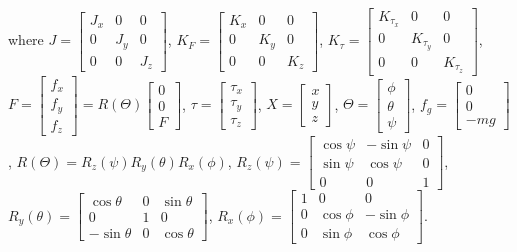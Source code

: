 \documentclass{ieeeaccess}
\begin{document}
where $J=\begin{bmatrix}
    J_{x} & 0 & 0 \\
    0 & J_{y} & 0 \\
    0 & 0 & J_{z}
\end{bmatrix}$, $K_F=\begin{bmatrix}
    K_{x} & 0 & 0 \\
    0 & K_{y} & 0 \\
    0 & 0 & K_{z}
\end{bmatrix}$, $K_\tau=\begin{bmatrix}
    K_{\tau_x} & 0 & 0 \\
    0 & K_{\tau_y} & 0 \\
    0 & 0 & K_{\tau_z}
\end{bmatrix}$, $F =\begin{bmatrix}
    f_x \\ f_y \\ f_z
\end{bmatrix} = R(\Theta)\begin{bmatrix}
    0 \\ 0 \\ F
\end{bmatrix}$, $\tau=\begin{bmatrix}
    \tau_x \\ \tau_y \\ \tau_z
\end{bmatrix}$, $X=\begin{bmatrix}
    x \\ y \\ z
\end{bmatrix}$, $\Theta=\begin{bmatrix}
    \phi \\ \theta \\ \psi
\end{bmatrix}$, $f_g=\begin{bmatrix}
    0 \\ 0 \\ -mg
\end{bmatrix}$, $R(\Theta)=R_z(\psi)R_y(\theta)R_x(\phi)$, $R_z(\psi)=\begin{bmatrix} %
    \cos\psi & -\sin\psi & 0 \\
    \sin\psi & \cos\psi & 0 \\
    0 & 0 & 1
\end{bmatrix}$, $R_y(\theta)=\begin{bmatrix}
    \cos\theta & 0 & \sin\theta \\
    0 & 1 & 0 \\
    -\sin\theta & 0 & \cos\theta
\end{bmatrix}$, $R_x(\phi)=\begin{bmatrix}
    1 & 0 & 0 \\
    0 & \cos\phi & -\sin\phi \\
    0 & \sin\phi & \cos\phi
\end{bmatrix}$.
\end{document}
